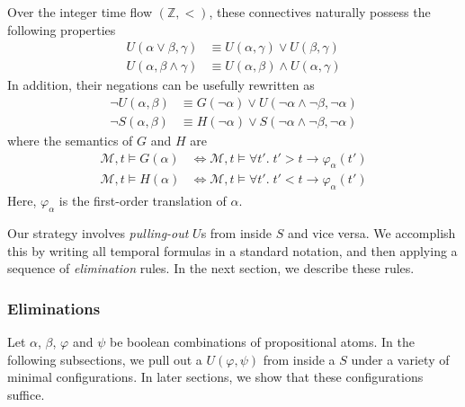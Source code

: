 \documentclass[a4paper,UKenglish,cleveref, autoref, thm-restate, numberwithinsect]{lipics-v2021}
\begin{document}
Over the integer time flow $(\mathbb{Z}, <)$, these connectives naturally possess the following properties
\begin{equation}
    \label{eq:or-and-S-U}
    \begin{aligned}
        U(\alpha \lor \beta, \gamma) &\equiv U(\alpha, \gamma) \lor U(\beta, \gamma)\\
        U(\alpha, \beta \land \gamma) &\equiv U(\alpha, \beta) \land U(\alpha, \gamma)
    \end{aligned}
\end{equation}
In addition, their negations can be usefully rewritten as
\begin{equation*}
    \begin{aligned}
        \lnot U(\alpha, \beta) &\equiv G(\lnot \alpha) \lor U(\lnot \alpha \land \lnot \beta, \lnot \alpha) \\
        \lnot S(\alpha, \beta) &\equiv H(\lnot \alpha) \lor S(\lnot \alpha \land \lnot \beta, \lnot \alpha)
    \end{aligned}
\end{equation*}
where the semantics of $G$ and $H$ are
\begin{equation*}
    \begin{aligned}
        \mathcal{M}, t \vDash G(\alpha) &\Longleftrightarrow \mathcal{M}, t \vDash \forall t'.\; t' > t \to \varphi_\alpha(t') \\
        \mathcal{M}, t \vDash H(\alpha) &\Longleftrightarrow \mathcal{M}, t \vDash \forall t'.\; t' < t \to \varphi_\alpha(t')
    \end{aligned}
\end{equation*}
Here, $\varphi_\alpha$ is the first-order translation of $\alpha$.

Our strategy involves \textit{pulling-out} $U$s from inside $S$ and vice versa. We accomplish this by writing all temporal formulas in a standard notation, and then applying a sequence of \textit{elimination} rules. In the next section, we describe these rules.

\subsubsection{Eliminations}
\label{sec:eliminations-linear}

Let $\alpha$, $\beta$, $\varphi$ and $\psi$ be boolean combinations of propositional atoms. In the following subsections, we pull out a $U(\varphi, \psi)$ from inside a $S$ under a variety of minimal configurations. In later sections, we show that these configurations suffice.
\end{document}
